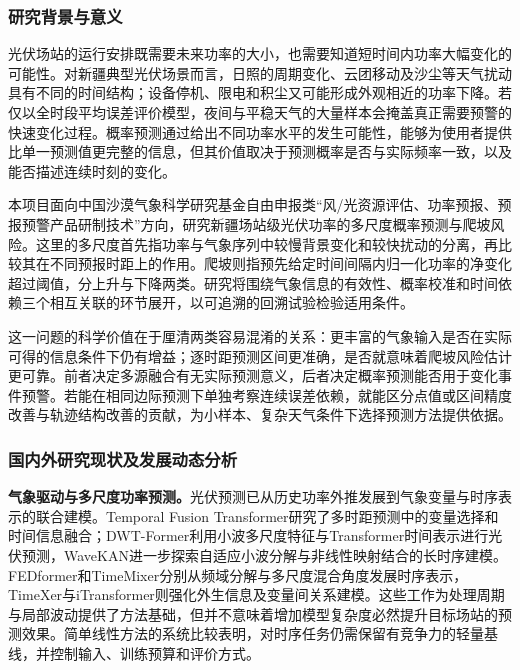\justifying
\NSFCBodyText

\subsubsection{研究背景与意义}
光伏场站的运行安排既需要未来功率的大小，也需要知道短时间内功率大幅变化的可能性。对新疆典型光伏场景而言，日照的周期变化、云团移动及沙尘等天气扰动具有不同的时间结构；设备停机、限电和积尘又可能形成外观相近的功率下降。若仅以全时段平均误差评价模型，夜间与平稳天气的大量样本会掩盖真正需要预警的快速变化过程。概率预测通过给出不同功率水平的发生可能性，能够为使用者提供比单一预测值更完整的信息，但其价值取决于预测概率是否与实际频率一致，以及能否描述连续时刻的变化\cite{gneiting2023solar,hobbs2022ramp}。

本项目面向中国沙漠气象科学研究基金自由申报类“风/光资源评估、功率预报、预报预警产品研制技术”方向，研究新疆场站级光伏功率的多尺度概率预测与爬坡风险。这里的多尺度首先指功率与气象序列中较慢背景变化和较快扰动的分离，再比较其在不同预报时距上的作用。爬坡则指预先给定时间间隔内归一化功率的净变化超过阈值，分上升与下降两类。研究将围绕气象信息的有效性、概率校准和时间依赖三个相互关联的环节展开，以可追溯的回溯试验检验适用条件。

这一问题的科学价值在于厘清两类容易混淆的关系：更丰富的气象输入是否在实际可得的信息条件下仍有增益；逐时距预测区间更准确，是否就意味着爬坡风险估计更可靠。前者决定多源融合有无实际预测意义，后者决定概率预测能否用于变化事件预警。若能在相同边际预测下单独考察连续误差依赖，就能区分点值或区间精度改善与轨迹结构改善的贡献，为小样本、复杂天气条件下选择预测方法提供依据。

\subsubsection{国内外研究现状及发展动态分析}
\textbf{气象驱动与多尺度功率预测。}光伏预测已从历史功率外推发展到气象变量与时序表示的联合建模。Temporal Fusion Transformer研究了多时距预测中的变量选择和时间信息融合\cite{lim2021tft}；DWT-Former利用小波多尺度特征与Transformer时间表示进行光伏预测，WaveKAN进一步探索自适应小波分解与非线性映射结合的长时序建模\cite{sun2025dwt,liu2026wavekan}。FEDformer和TimeMixer分别从频域分解与多尺度混合角度发展时序表示，TimeXer与iTransformer则强化外生信息及变量间关系建模\cite{zhou2022fedformer,wang2024timemixer,wang2024timexer,liu2024itransformer}。这些工作为处理周期与局部波动提供了方法基础，但并不意味着增加模型复杂度必然提升目标场站的预测效果。简单线性方法的系统比较表明，对时序任务仍需保留有竞争力的轻量基线，并控制输入、训练预算和评价方式\cite{zeng2023linear}。

